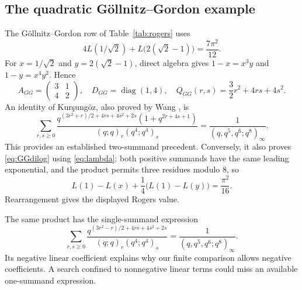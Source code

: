\documentclass[11pt,reqno]{amsart}
\theoremstyle{remark}
\numberwithin{equation}{section}
\begin{document}
\subsection{The quadratic G\"ollnitz--Gordon example}
The G\"ollnitz--Gordon row of Table~\ref{tab:rogers} uses
\begin{equation}\label{eq:GGdilog}
 4L(1/\sqrt2)+L\bigl(2(\sqrt2-1)\bigr)=\frac{7\pi^2}{12}.
\end{equation}
For $x=1/\sqrt2$ and $y=2(\sqrt2-1)$, direct algebra gives
$1-x=x^3y$ and $1-y=x^4y^2$. Hence
\[
 A_{GG}=\begin{pmatrix}3&1\\4&2\end{pmatrix},\quad
 D_{GG}=\operatorname{diag}(1,4),\quad
 Q_{GG}(r,s)=\frac32r^2+4rs+4s^2.
\]
An identity of Kur\c{s}ung\"oz, also proved by Wang
\cite{KursungozCapp,WangDouble}, is
\begin{equation}\label{eq:GGtwo}
 \sum_{r,s\geq0}
 \frac{q^{(3r^2+r)/2+4rs+4s^2+2s}(1+q^{2r+4s+1})}
 {(q;q)_r(q^4;q^4)_s}
 =\frac1{(q,q^5,q^6;q^8)_\infty}.
\end{equation}
This provides an established two-summand precedent. Conversely, it also
proves \eqref{eq:GGdilog} using \eqref{eq:lambda}: both positive summands
have the same leading exponential, and the product permits three residues
modulo $8$, so
\[
 L(1)-L(x)+\frac14\bigl(L(1)-L(y)\bigr)=\frac{\pi^2}{16}.
\]
Rearrangement gives the displayed Rogers value.

The same product has the single-summand expression
\cite[Theorem~3.17]{LiWang}
\begin{equation}\label{eq:GGone}
 \sum_{r,s\geq0}
 \frac{q^{(3r^2-r)/2+4rs+4s^2+2s}}{(q;q)_r(q^4;q^4)_s}
 =\frac1{(q,q^5,q^6;q^8)_\infty}.
\end{equation}
Its negative linear coefficient explains why our finite comparison
allows negative coefficients. A search confined to nonnegative linear
terms could miss an available one-summand expression.
\end{document}
